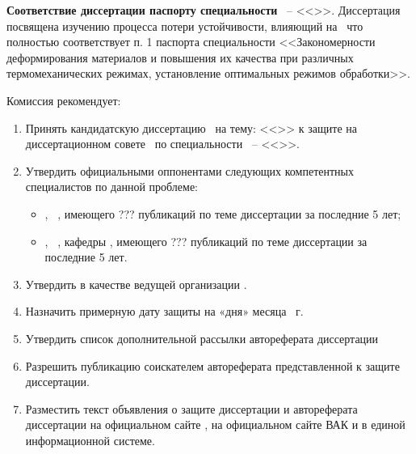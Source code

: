 \textbf{Соответствие диссертации паспорту специальности} \thesisSpecialtyNumber\ -- <<\thesisSpecialtyTitle>>. Диссертация посвящена изучению процесса потери устойчивости, влияющий на \aimOne\ что полностью соответствует п. 1 паспорта специальности <<Закономерности деформирования материалов и повышения их качества при различных термомеханических режимах, установление оптимальных режимов обработки>>.

Комиссия рекомендует:

\begin{enumerate}
	\item Принять кандидатскую диссертацию \thesisAuthorLastNameFrom\ на тему: <<\thesisTitle>> к защите на диссертационном совете \ по специальности \thesisSpecialtyNumber\ -- <<\thesisSpecialtyTitle>>.
	\item Утвердить официальными оппонентами следующих компетентных специалистов по данной проблеме:
		\begin{itemize}
		\item \opponentOneWhomFio, \opponentOneWhomRegalia\ \opponentOneSpecialityNumber, имеющего ??? публикаций по теме диссертации за последние 5 лет;
		\item \opponentTwoWhomFio, \opponentTwoWhomRegalia\ \opponentTwoSpecialityNumber, кафедры \opponentTwoJobPlace, имеющего ??? публикаций по теме диссертации за последние 5 лет.
		\end{itemize}
	\item Утвердить в качестве ведущей организации \leadingOrganizationTitle.
	\item Назначить примерную дату защиты на «дня» месяца \thesisYear~г.
	\item Утвердить список дополнительной рассылки автореферата диссертации
	\item Разрешить публикацию соискателем автореферата представленной к защите диссертации.
	\item Разместить текст объявления о защите диссертации и автореферата диссертации на официальном сайте \thesisOrganizationShort, на официальном сайте ВАК и в единой информационной системе.
	
\end{enumerate}


\vspace{5cm}



